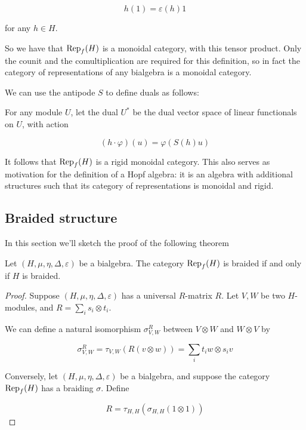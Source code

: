 \begin{equation}
    h(1) = \varepsilon(h) 1
\end{equation}

 for any $h\in H$.

So we have that $\operatorname{Rep}_f(H)$ is a monoidal category, with this tensor product.
Only the counit and the comultiplication are required for this definition, so
in fact the category of representations of any bialgebra is a monoidal
category.

We can use the antipode $S$ to define duals as follows:

For any module $U$, let the dual $U^*$ be the dual vector space of linear
functionals on $U$, with action

\begin{equation}
    (h\cdot \varphi)(u)  = \varphi(S(h) u)
\end{equation}

It follows that $\operatorname{Rep}_f(H)$ is a rigid monoidal category. This also serves as
motivation for the definition of a Hopf algebra: it is an algebra with
additional structures such that its category of representations is monoidal and
rigid. 


\subsection{Braided structure}
\label{bialgtocategory}
In this section we'll sketch the proof of the following theorem

\begin{theorem}
    Let $(H, \mu, \eta, \Delta, \varepsilon)$ be a bialgebra. The category $\operatorname{Rep}_f(H)$ is braided if and only if $H$ is braided. 
\end{theorem}
\begin{proof}
    Suppose $(H, \mu, \eta, \Delta, \varepsilon)$ has a universal $R$-matrix $R$. Let $V,W$ be two $H$-modules, and $R = \sum_{i} s_i \otimes t_i$. 

    We can define a natural isomorphism $\sigma_{V,W}^R$ between $V \otimes W$ and $W \otimes V$ by

    \begin{equation}
        \sigma_{V,W}^R = \tau_{V,W}(R(v \otimes w)) = \sum_{i} t_i w \otimes s_i v
    \end{equation}

    Conversely, let $(H, \mu, \eta, \Delta, \varepsilon)$ be a bialgebra, and suppose the category $\operatorname{Rep}_f(H)$ has a braiding $\sigma$. Define 

    \begin{equation}
        R = \tau_{H,H}(\sigma_{H,H}(1 \otimes 1))
    \end{equation}

\end{proof}


